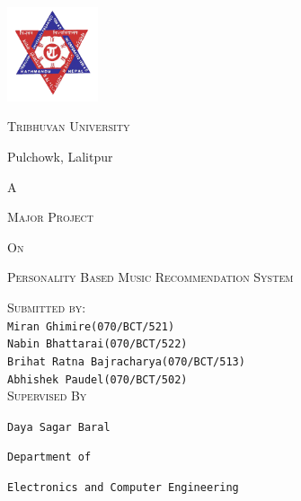 \documentclass[a4paper, 12pt, onepage]{article}
\begin{document}
\begin{titlepage}
  \centering
  \includegraphics[width=0.2\textwidth]{tu_logo.png}\par
  {\large\scshape Tribhuvan University\par}
  \vspace{0.3cm}
  {\large Pulchowk, Lalitpur \par}
  \vspace{3cm}
  	{\large\scshape A\par}
	{\large\scshape Major Project\par}
        {\large\scshape On\par}
        {\large\scshape Personality Based Music Recommendation System\par}
	\vspace{2.5cm}
        {\large\scshape Submitted by:}\\
        \vspace{0.2cm}
        {
          {\normalsize\verb+Miran Ghimire(070/BCT/521)+}\\
          \vspace{0.1cm}
         {\normalsize\verb+Nabin Bhattarai(070/BCT/522)+}\\
         \vspace{0.1cm}
         {\normalsize\verb+Brihat Ratna Bajracharya(070/BCT/513)+}\\
         \vspace{0.1cm}
        {\normalsize\verb+Abhishek Paudel(070/BCT/502)+}\\
         \vspace{0.1cm}
        }
        \vspace{1cm}
        {\large\scshape Supervised By}\\
        \vspace{0.2cm}
        {
          {\normalsize \verb+Daya Sagar Baral+\par}
          \vspace{0.1cm}
          {\normalsize \verb+Department of+\par}
          \vspace{0.1cm}
          {\normalsize\verb+Electronics and Computer Engineering+}
          \vspace{0.1cm}
        }
\vspace{1cm}
        \vfill


\end{titlepage}
\end{document}
